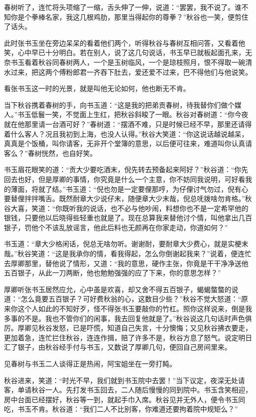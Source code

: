 \documentclass[12pt,UTF8]{ctexbook}
\begin{document}
{{{春树听了，连忙将头项缩了一缩，舌头伸了一伸，说道：“罢罢，我不说了。谁不知你是个拳棒名家，我这几根鸡肋，那里当得起你的尊拳？”秋谷也一笑，便剪住了话头。

此时张书玉坐在旁边呆呆的看着他们两个，听得秋谷与春树互相问答，又看着他笑，心中早已十分明白。若在别人，说了这几句说话，书玉早已就板起面孔来，无奈书玉看着秋谷同春树两人，一个是玉树临风，一个是琼枝照月，恨不得取一碗清水过来，把这两个傅粉郎君一齐吞下肚去，爱还爱不过来，巴不得他们与他说笑。

看张书玉这一时的光景，就是叫他无论如何，他也断无不肯。

当下秋谷携着春树的手，向书玉道：“这是我的把弟贡春树，待我替你们做个媒人。”书玉低鬟一笑，不觉面上生红，把秋谷斜睃了一眼。秋谷对春树道：“你今夜就在他那里请一台酒可好？”春树道：“摆酒不难，只是时候已经不早，那里还请得着什么客人？况且我初到上海，也没人认得。”秋谷大笑道：“你这说话越说越呆，真真是个饭桶，叫你请客，无非开个堂簿的意思，以后便可往来，难道叫你认真请客么？”春树恍然，也自好笑。

书玉眉花眼笑的道：“贡大少要吃酒末，倪先转去预备起来阿好？”秋谷道：“你先回去也好，但是厚卿的事情，你究竟是什么一个主意，你不妨同我说明，可好看我的薄面，将就了结。”书玉道：“倪也勿是一定要俚那哼，为仔俚讨气勿过，倪有心要替俚拌拌嘴舌。既然耐章大少说仔末，随便章大少末哉，倪总呒拨啥勿肯格。”秋谷大喜，笑道：“你既听我的说话，也不必与他吵闹，料想你也不是一定希罕他的银钱，只要他以后晓得些轻重也就是了。现在总算我来替他讨个情，叫他拿出几百银子，罚他个不该乱放谣言，他此后料也无颜再在你家走动，你道如何？”

书玉道：“章大少格闲话，倪总无啥勿听。谢谢耐，要耐章大少费心，就是实梗末哉。”秋谷笑道：“这是我承你的情，看我得起，怎么你倒谢起我来？”说着，便连忙去厚卿那里，替他说了情形，又道：“我的意思，硬作主张，你竟是干干净净送他五百银子，从此一刀两断，他也勉勉强强的应了下来，你的意思怎样？”

厚卿听张书玉居然应允，心中虽是欢喜，却又舍不得五百银子，蝎蝎螫螫的说道：“怎么竟要五百银子？可好费秋翁的心，这数目少些？”秋谷不觉大怒道：“原来你这个人如此的不知好歹，怪不得张书玉要敲你的竹杠。照你这样说来，倒是我多事的不是。我也不管你们的闲事，我去回复他就是了。”秋谷说这几句话时声色俱厉。厚卿见秋谷发怒，已是吓慌，知道自己失言，十分懊悔；又见秋谷拂衣要走，更加着急，连忙拦住秋谷，连连作揖，赔了许多不是，秋谷方息了怒气。说定明日汇了银子，由秋谷经手付与书玉，又数说了厚卿几句，便回自己房间里来。

见春树与书玉二人谈得正是热闹，阿宝姐坐在一旁打盹。

秋谷进来，笑道：“时光不早，我们就到书玉院中去罢！”当下议定，夜深无处请客，单请秋谷一人。先打发书玉回去，二人随后慢慢的同到院中。书玉含笑相迎，房中台面已经摆好，秋谷等一到，就起手巾入席。秋谷见并无外人，便令书玉同吃，书玉不肯。秋谷道：“我们二人不比别客，你难道还要拘着院中规矩么？”

}}}
\end{document}
